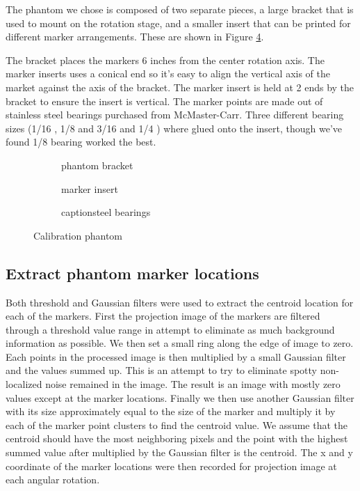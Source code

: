 The phantom we chose is composed of two separate pieces, a large bracket that is used to mount on the rotation stage, and a smaller insert that can be printed for different marker arrangements.  These are shown in Figure \ref{fig:calibration_phantom}.  

The bracket places the markers 6 inches from the center rotation axis.  The marker inserts uses a conical end so it's easy to align the vertical axis of the market against the axis of the bracket.  The marker insert is held at 2 ends by the bracket to ensure the insert is vertical.  The marker points are made out of stainless steel bearings purchased from McMaster-Carr.  Three different bearing sizes (1/16 \inches, 1/8 \inches and 3/16 \inches and 1/4 \inches) where glued onto the insert, though we've found 1/8 \inches bearing worked the best.  

\begin{figure}
\centering
	\begin{subfigure}[b]{0.3\linewidth}
	\centering
	\caption{phantom bracket}
	\label{fig:phantom_bracket}
	\end{subfigure}
\hspace{0.2cm}
	\begin{subfigure}[b]{0.3\linewidth}
	\centering
	\caption{marker insert}
	\label{fig:marker_holder}
	\end{subfigure}
\hspace{0.2cm}
	\begin{subfigure}[b]{0.3\linewidth}
	\centering
	caption{steel bearings}
	\label{fig:steel_bearings}
	\end{subfigure}
\caption{Calibration phantom}
\label{fig:calibration_phantom}
\end{figure}


\subsection{Extract phantom marker locations}
Both threshold and Gaussian filters were used to extract the centroid location for each of the markers.  First the projection image of the markers are filtered through a threshold value range in attempt to eliminate as much background information as possible.  We then set a small ring along the edge of image to zero.  Each points in the processed image is then multiplied by a small Gaussian filter and the values summed up.  This is an attempt to try to eliminate spotty non-localized noise remained in the image.  The result is an image with mostly zero values except at the marker locations.  Finally we then use another Gaussian filter with its size approximately equal to the size of the marker and multiply it by each of the marker point clusters to find the centroid value.  We assume that the centroid should have the most neighboring pixels and the point with the highest summed value after multiplied by the Gaussian filter is the centroid.  The x and y coordinate of the marker locations were then recorded for projection image at each angular rotation.

